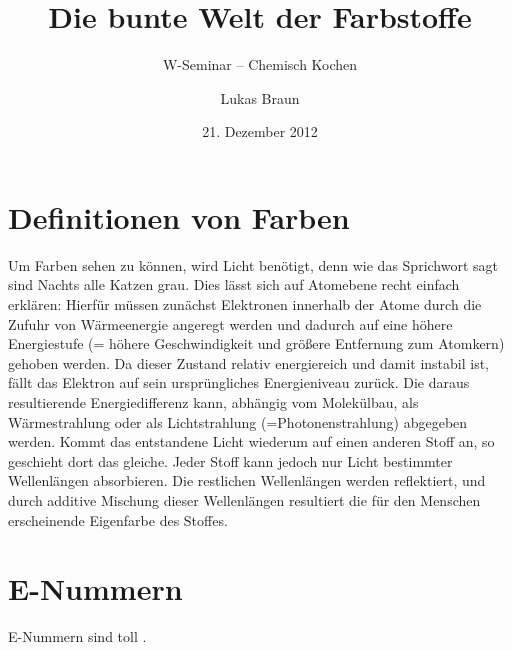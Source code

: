 \documentclass[11pt]{scrreprt}
\title{Die bunte Welt der Farbstoffe}
\author{Lukas Braun}
\subtitle{W-Seminar -- Chemisch Kochen}
\date{21. Dezember 2012}
\begin{document}
\maketitle
\clearpage

\tableofcontents
\clearpage
\chapter{Definitionen von Farben}
Um Farben sehen zu können, wird Licht benötigt, denn wie das Sprichwort sagt sind Nachts alle Katzen grau. Dies lässt sich auf Atomebene recht einfach erklären: Hierfür müssen zunächst Elektronen innerhalb der Atome durch die Zufuhr von Wärmeenergie angeregt werden und dadurch auf eine höhere Energiestufe (= höhere Geschwindigkeit und größere Entfernung zum Atomkern)  gehoben werden. Da dieser Zustand relativ energiereich und damit instabil ist, fällt das Elektron auf sein ursprüngliches Energieniveau zurück. Die daraus resultierende Energiedifferenz kann, abhängig vom Molekülbau, als Wärmestrahlung oder als Lichtstrahlung (=Photonenstrahlung) abgegeben werden. Kommt das entstandene Licht wiederum auf einen anderen Stoff an, so geschieht dort das gleiche. Jeder Stoff kann jedoch nur Licht bestimmter Wellenlängen absorbieren. Die restlichen Wellenlängen werden reflektiert, und durch additive Mischung dieser Wellenlängen resultiert die für den Menschen erscheinende Eigenfarbe des Stoffes.
\chapter{E-Nummern}

E-Nummern sind toll \cite[S. 12]{Schobert.2007}. \cite[j]{Schobert.2007}
\end{document}
